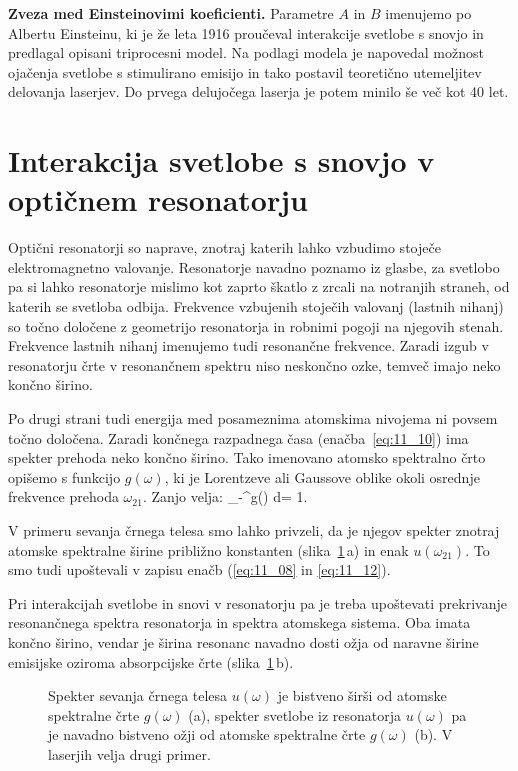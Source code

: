 \begin{example}{\bf Zveza med Einsteinovimi koeficienti.}
Parametre $A$ in $B$ imenujemo po Albertu Einsteinu, ki je že leta 
1916 proučeval interakcije svetlobe s snovjo in predlagal opisani triprocesni model. 
Na podlagi modela je napovedal možnost ojačenja svetlobe s stimulirano 
emisijo in tako postavil teoretično utemeljitev delovanja laserjev.
Do prvega delujočega laserja je potem minilo še  več kot 40 let. 
\end{example}

\section{Interakcija svetlobe s snovjo v optičnem resonatorju}
Optični resonatorji so naprave, znotraj katerih lahko vzbudimo 
stoječe elektromagnetno valovanje. Resonatorje navadno poznamo iz glasbe,
za svetlobo pa si lahko resonatorje mislimo kot zaprto škatlo
z zrcali na notranjih straneh, od katerih se svetloba odbija.
Frekvence vzbujenih stoječih valovanj (lastnih nihanj) so točno 
določene z geometrijo resonatorja in robnimi pogoji na njegovih stenah. 
Frekvence lastnih nihanj imenujemo tudi resonančne frekvence. 
Zaradi izgub v resonatorju črte v resonančnem spektru niso 
neskončno ozke, temveč imajo neko končno širino.

Po drugi strani tudi energija med posameznima atomskima nivojema 
ni povsem točno določena. Zaradi končnega razpadnega časa 
(enačba~\ref{eq:11_10}) ima spekter prehoda neko končno širino. Tako imenovano
atomsko spektralno črto opišemo s funkcijo $g(\omega)$,
ki je Lorentzeve ali  Gaussove oblike okoli osrednje 
frekvence prehoda $\omega_{21}$. Zanjo velja:
\beq
\int_{-\infty}^\infty g(\omega) d\omega = 1.
\label{eq:11_21}
\eeq

V primeru sevanja črnega telesa smo lahko privzeli, 
da je njegov spekter znotraj atomske spektralne širine 
približno konstanten (slika~\ref{fig:11_g}\,a) in enak $u(\omega_{21})$.
To smo tudi upoštevali v zapisu enačb (\ref{eq:11_08} in \ref{eq:11_12}). 

Pri interakcijah svetlobe in snovi v resonatorju pa je treba
upoštevati prekrivanje resonančnega spektra resonatorja in 
spektra atomskega sistema. Oba imata končno širino, vendar 
je širina resonanc navadno dosti ožja od naravne širine 
emisijske oziroma absorpcijske črte (slika~\ref{fig:11_g}\,b).
\begin{figure}[h!]
\centering
\def\svgwidth{120truemm} 

\caption{Spekter sevanja črnega telesa $u(\omega)$ je bistveno širši 
od atomske spektralne črte $g(\omega)$ (a), spekter svetlobe iz 
resonatorja $u(\omega)$ pa je navadno bistveno ožji od atomske 
spektralne črte $g(\omega)$ (b). V laserjih velja drugi primer.
}
\label{fig:11_g}
\end{figure}

